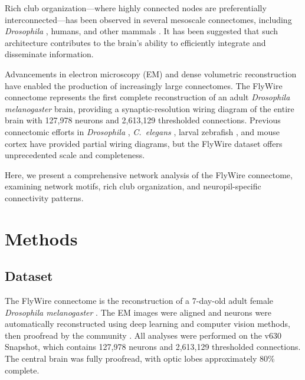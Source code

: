 \documentclass{article}
\begin{document}
Rich club organization---where highly connected nodes are preferentially interconnected---has been observed in several mesoscale connectomes, including \textit{Drosophila} \citep{shih2015connectomics, worrell2017optimized}, humans, and other mammals \citep{vandenheuvel2011rich, vandenheuvel2020rich, nigam2020rich}. It has been suggested that such architecture contributes to the brain's ability to efficiently integrate and disseminate information.

Advancements in electron microscopy (EM) and dense volumetric reconstruction have enabled the production of increasingly large connectomes. The FlyWire connectome \citep{dorkenwald2022flywire, schlegel2023neuronal, dorkenwald2023connectome} represents the first complete reconstruction of an adult \textit{Drosophila melanogaster} brain, providing a synaptic-resolution wiring diagram of the entire brain with 127,978 neurons and 2,613,129 thresholded connections. Previous connectomic efforts in \textit{Drosophila} \citep{zheng2018complete}, \textit{C.~elegans} \citep{cook2019whole, towlson2013rich}, larval zebrafish \citep{vishwanathan2023cyclic}, and mouse cortex \citep{shapson2022reconstruction} have provided partial wiring diagrams, but the FlyWire dataset offers unprecedented scale and completeness.

Here, we present a comprehensive network analysis of the FlyWire connectome, examining network motifs, rich club organization, and neuropil-specific connectivity patterns.

\section{Methods}

\subsection{Dataset}

The FlyWire connectome is the reconstruction of a 7-day-old adult female \textit{Drosophila melanogaster} \citep{zheng2018complete, dorkenwald2022flywire, schlegel2023neuronal}. The EM images were aligned and neurons were automatically reconstructed using deep learning and computer vision methods, then proofread by the community \citep{dorkenwald2022flywire, schlegel2023neuronal}. All analyses were performed on the v630 Snapshot, which contains 127,978 neurons and 2,613,129 thresholded connections. The central brain was fully proofread, with optic lobes approximately 80\% complete.
\end{document}

